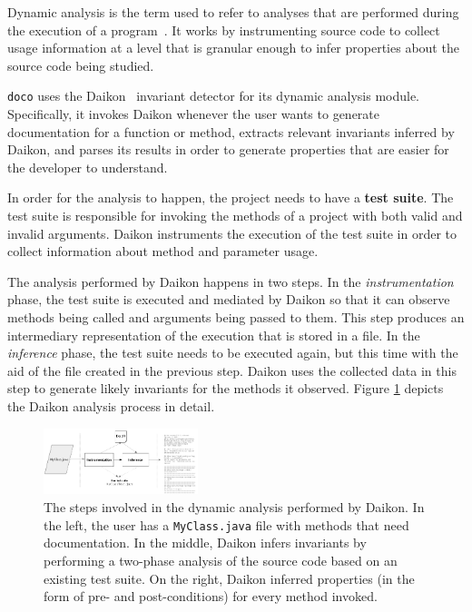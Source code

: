 Dynamic analysis is the term used to refer to analyses that are performed during the execution of a program~\cite{Ball:1999}. It works by instrumenting source code to collect usage information at a level that is granular enough to infer properties about the source code being studied.

\texttt{doco} uses the Daikon~\cite{Ernst:2007} invariant detector for its dynamic analysis module. Specifically, it invokes Daikon whenever the user wants to generate documentation for a function or method, extracts relevant invariants inferred by Daikon, and parses its results in order to generate properties that are easier for the developer to understand.

In order for the analysis to happen, the project needs to have a \textbf{test suite}. The test suite is responsible for invoking the methods of a project with both valid and invalid arguments. Daikon instruments the execution of the test suite in order to collect information about method and parameter usage.

The analysis performed by Daikon happens in two steps. In the \emph{instrumentation} phase, the test suite is executed and mediated by Daikon so that it can observe methods being called and arguments being passed to them. This step produces an intermediary representation of the execution that is stored in a file. In the \emph{inference} phase, the test suite needs to be executed again, but this time with the aid of the file created in the previous step. Daikon uses the collected data in this step to generate likely invariants for the methods it observed. Figure \ref{fig:daikon} depicts the Daikon analysis process in detail.

\begin{figure}[h]
  \centering
    \includegraphics[width=0.4\textwidth]{daikon_flow.png}
    \caption{The steps involved in the dynamic analysis performed by Daikon. In the left, the user has a \texttt{MyClass.java} file with methods that need documentation. In the middle, Daikon infers invariants by performing a two-phase analysis of the source code based on an existing test suite. On the right, Daikon inferred properties (in the form of pre- and post-conditions) for every method invoked.}
    \label{fig:daikon}
\end{figure}

